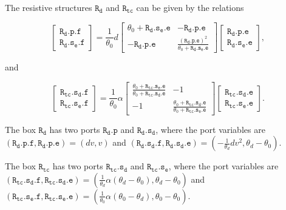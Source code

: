 \documentclass[
	parskip, 			   %
	twoside, 			   %
	DIV=14, 			   %
	BCOR=15.0mm, 		   %
	headsepline, 		   %
	open=right, 		   %
	captions=tableheading, %
	bibliography=totoc,    %
	numbers=noenddot       %
]{scrreprt}
\begin{document}
The resistive structures $\mathtt{R_d}$ and $\mathtt{R_{tc}}$ can be given by the relations

\begin{equation}
    \label{eq:resistive_structure_damping_interconnection_ndho}
    \left[\begin{array}{l}\mathtt{R_{d}.p.f} \\ \mathtt{R_{d}.s_{e}.f}\end{array}\right]=\frac{1}{\theta_0} d\left[\begin{array}{rr}\theta_0+\mathtt{R_{d}.s_{e}.e} & -\mathtt{R_{d}.p.e} \\ -\mathtt{R_{d}.p.e} & \frac{(\mathtt{R_{d}.p.e})^2}{\theta_0+\mathtt{R_{d}.s_{e}.e}}\end{array}\right]\left[\begin{array}{l}\mathtt{R_{d}.p.e} \\ \mathtt{R_{d}.s_{e}.e}\end{array}\right],
\end{equation}

and

\begin{equation}
    \label{eq:resistive_structure_thermal_conduction_interconnection_ndho}
    \left[\begin{array}{l}\mathtt{R_{tc}.s_{d}.f} \\ \mathtt{R_{tc}.s_{e}.f}\end{array}\right]=\frac{1}{\theta_0} \alpha \left[\begin{array}{rr} \frac{\theta_0+\mathtt{R_{tc}.s_{e}.e}}{\theta_0+\mathtt{R_{tc}.s_{d}.e}} & -1 \\ -1 & \frac{\theta_0+\mathtt{R_{tc}.s_{d}.e}}{\theta_0+\mathtt{R_{tc}.s_{e}.e}}\end{array}\right]\left[\begin{array}{l}\mathtt{R_{tc}.s_{d}.e} \\ \mathtt{R_{tc}.s_{e}.e}\end{array}\right].
\end{equation}

The box $\mathtt{R_d}$ has two ports $\mathtt{R_{d}.p}$ and $\mathtt{R_{d}.s_{d}}$, where the port variables are $(\mathtt{R_{d}.p.f}, \mathtt{R_{d}.p.e}) = (dv, v)$ and $(\mathtt{R_{d}.s_{d}.f}, \mathtt{R_{d}.s_{d}.e}) = (-\frac{1}{\theta_d}dv^2, \theta_d - \theta_0)$.

The box $\mathtt{R_{tc}}$ has two ports $\mathtt{R_{tc}.s_{d}}$ and $\mathtt{R_{tc}.s_{e}}$, where the port variables are $(\mathtt{R_{tc}.s_{d}.f}, \mathtt{R_{tc}.s_{d}.e}) = (\frac{1}{\theta_d}\alpha(\theta_d-\theta_0), \theta_d-\theta_0)$ and $(\mathtt{R_{tc}.s_{e}.f}, \mathtt{R_{tc}.s_{e}.e}) = (\frac{1}{\theta_0}\alpha(\theta_0-\theta_d), \theta_0-\theta_0)$.
\end{document}

